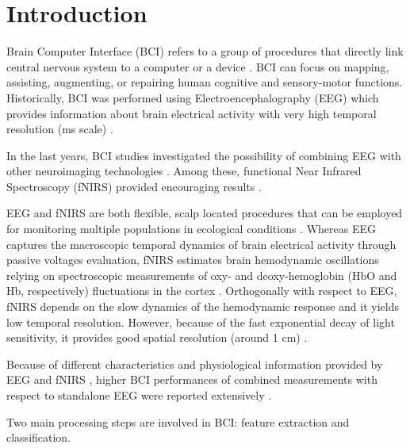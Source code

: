\documentclass[12pt]{iopart}
\begin{document}
\section{Introduction}

Brain Computer Interface (BCI) refers to a group of procedures that directly link  central nervous system to a computer or a device \parencite{wolpaw2000brain}. BCI can focus on mapping, assisting, augmenting, or repairing human cognitive and sensory-motor functions. 
Historically, BCI was performed using Electroencephalography (EEG) \parencite{lotte2007review} which  provides information about brain electrical activity with very high temporal resolution (ms scale) \parencite{hallez2007review}. 

In the last years, BCI studies investigated the possibility of combining EEG with other neuroimaging technologies \parencite{pfurtscheller2010hybrid}. Among these, functional Near Infrared Spectroscopy (fNIRS) provided encouraging results \parencite{fazli2012enhanced}. 

EEG and fNIRS are both flexible, scalp located procedures that can be employed for monitoring multiple populations in ecological conditions \parencite{farroni2013infant, costantini2013studying, zappasodi2017prognostic, watanabe1999neonatal}. Whereas EEG captures the macroscopic temporal dynamics of brain electrical activity through passive voltages evaluation, fNIRS estimates brain hemodynamic oscillations  relying on spectroscopic measurements of oxy- and deoxy-hemoglobin (HbO and Hb, respectively) fluctuations in the cortex \parencite{villringer1997non, ferrari2012brief}. Orthogonally with respect to EEG, fNIRS depends on the slow dynamics of the hemodynamic response and it yields low temporal resolution. However, because of the fast exponential decay of light sensitivity, it provides good spatial resolution (around 1 cm) \parencite{chiarelli2016combining, chiarelli2015comparison}. 

Because of different characteristics and physiological information provided by EEG and fNIRS \parencite{croce2017exploiting}, higher BCI performances  of combined measurements with respect to standalone EEG were reported extensively \parencite{fazli2012enhanced, khan2014decoding, hong2015classification, chiarelli2017simultaneous, shin2017evaluation, shin2017open}.

Two main processing steps are involved in BCI:  feature extraction and classification. 
\end{document}
